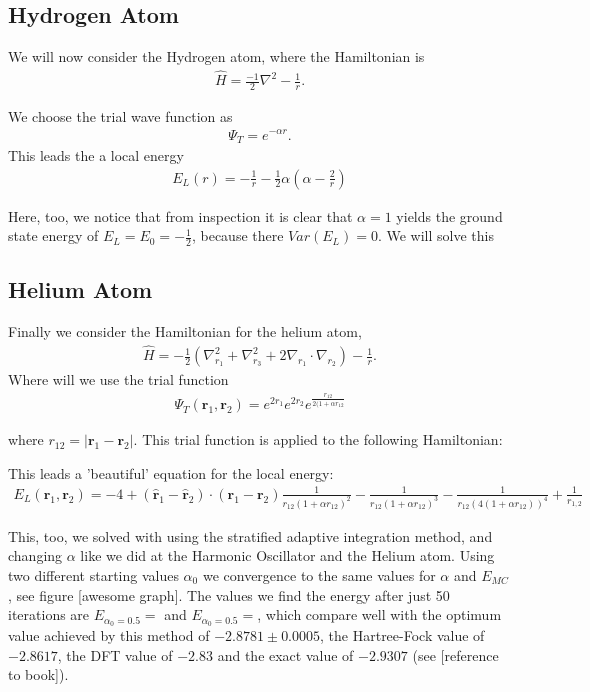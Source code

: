 \subsection{Hydrogen Atom}
We will now consider the Hydrogen atom, where the Hamiltonian is
\begin{align}
  \hat{H} = \frac{-1}{2}\nabla^2 - \frac{1}{r}.
\end{align}

We choose the trial wave function as
  \begin{align}
    \Psi_T = e^{-\alpha r}.
  \end{align}
This leads the a local energy
  \begin{align}
    E_L(r) = - \frac{1}{r} - \frac{1}{2}\alpha(\alpha - \frac{2}{r})
  \end{align}

Here, too, we notice that from inspection it is clear that $\alpha = 1$ yields the ground state energy of $E_L = E_0 = -\frac{1}{2}$, because there $Var(E_L) = 0$. We will solve this




\subsection{Helium Atom}
Finally we consider the Hamiltonian for the helium atom,
\begin{align}
  \hat{H} = -\frac{1}{2}(\nabla_{r_1}^2 + \nabla_{r_3}^2 + 2\nabla_{r_1}\cdot \nabla_{r_2}) - \frac{1}{r}.
\end{align}
Where will we use the trial function
  \begin{align}
    \Psi_T (\textbf{r}_1,\textbf{r}_2) = e^{2r_1}e^{2r_2}e^{\frac{r_{12}}{2(1+\alpha r_{12}}}
  \end{align}

where $r_{12} = |\textbf{r}_1 - \textbf{r}_2 |$. This trial function is applied to the following Hamiltonian:


This leads a 'beautiful' equation for the local energy:
  \begin{align}
    E_L(\textbf{r}_1,\textbf{r}_2) = -4  + (\hat{\textbf{r}}_1 - \hat{\textbf{r}}_2) \cdot (\textbf{r}_1 - \textbf{r}_2) \frac{1}{r_{12}(1+\alpha r_{12})^2} -  \frac{1}{r_{12}(1+\alpha r_{12})^3} - \frac{1}{r_{12}(4(1+\alpha r_{12}))^4} + \frac{1}{r_{1,2}}   \end{align}
  
This, too, we solved with using the stratified adaptive integration method, and changing $\alpha$ like we did at the Harmonic Oscillator and the Helium atom. Using two different starting values $\alpha_0$ we convergence to the same values for $\alpha$ and $E_{MC}$, see figure [awesome graph]. The values we find the energy after just 50 iterations are $E_{\alpha_0 = 0.5} =  $ and $E_{\alpha_0 = 0.5} =  $, which compare well with the optimum value achieved by this method of $-2.8781 \pm 0.0005$, the Hartree-Fock value of $-2.8617$, the DFT value of $-2.83$ and the exact value of $-2.9307$ (see [reference to book]). 

